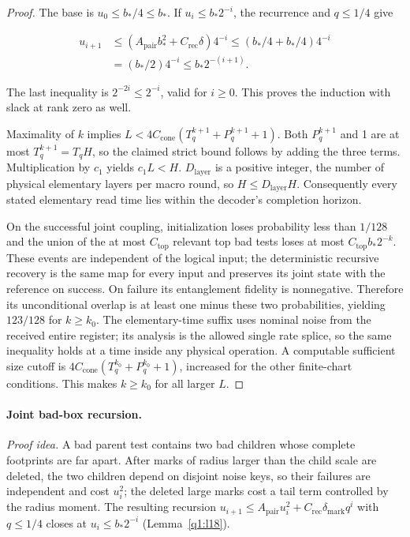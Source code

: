 \begin{proof}
The base is \(u_{0}\le b_{*}/4\le b_{*}\). If \(u_{i}\le b_{*}2^{-i}\), the recurrence and \(q\le 1/4\) give

\begin{align*}
u_{i+1} &\le (A_{\mathrm{pair}} b_{*}^{2} + C_{\mathrm{rec}} \delta)4^{-i}
 \le (b_{*}/4+b_{*}/4)4^{-i}\\
 &= (b_{*}/2)4^{-i}
 \le b_{*}2^{-(i+1)}.
\end{align*}

The last inequality is \(2^{-2i}\le 2^{-i}\), valid for \(i\ge 0\). This proves the induction with slack at rank zero as well.

Maximality of \(k\) implies \(L<4 C_{\mathrm{cone}}(T_{q}^{k+1}+P_{q}^{k+1}+1)\). Both \(P_{q}^{k+1}\) and 1 are at most \(T_{q}^{k+1}=T_{q} H\), so the claimed strict bound follows by adding the three terms. Multiplication by \(c_{1}\) yields \(c_{1} L<H\). \(D_{\mathrm{layer}}\) is a positive integer, the number of physical elementary layers per macro round, so \(H\le D_{\mathrm{layer}} H\). Consequently every stated elementary read time lies within the decoder's completion horizon.

On the successful joint coupling, initialization loses probability less than \(1/128\) and the union of the at most \(C_{\mathrm{top}}\) relevant top bad tests loses at most \(C_{\mathrm{top}} b_{*}2^{-k}\). These events are independent of the logical input; the deterministic recursive recovery is the same map for every input and preserves its joint state with the reference on success. On failure its entanglement fidelity is nonnegative. Therefore its unconditional overlap is at least one minus these two probabilities, yielding \(123/128\) for \(k\ge k_{0}\). The elementary-time suffix uses nominal noise from the received entire register; its analysis is the allowed single rate splice, so the same inequality holds at a time inside any physical operation. A computable sufficient size cutoff is \(4 C_{\mathrm{cone}}(T_{q}^{k_{0}}+P_{q}^{k_{0}}+1)\), increased for the other finite-chart conditions. This makes \(k\ge k_{0}\) for all larger \(L\). 
\end{proof}



\paragraph{Joint bad-box recursion.}
\emph{Proof idea.} A bad parent test contains two bad children whose complete footprints are far apart. After marks of radius larger than the child scale are deleted, the two children depend on disjoint noise keys, so their failures are independent and cost \(u_i^2\); the deleted large marks cost a tail term controlled by the radius moment. The resulting recursion \(u_{i+1}\le A_{\mathrm{pair}}u_i^2+C_{\mathrm{rec}}\delta_{\mathrm{mark}}q^i\) with \(q\le1/4\) closes at \(u_i\le b_*2^{-i}\) (Lemma~\ref{q1:l18}).

